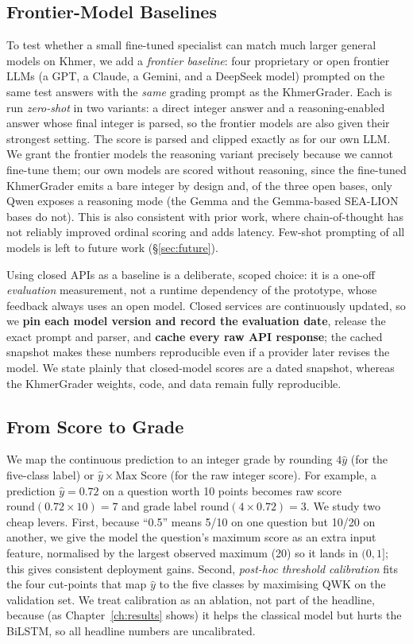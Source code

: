 \subsection{Frontier-Model Baselines}
\label{sec:frontier}
To test whether a small fine-tuned specialist can match much larger general models on Khmer, we add a
\emph{frontier baseline}: four proprietary or open frontier LLMs (a GPT, a Claude, a Gemini, and a
DeepSeek model) prompted on the same test answers with the \emph{same} grading prompt as the
KhmerGrader. Each is run \emph{zero-shot} in two variants: a direct integer answer and a
reasoning-enabled answer whose final integer is parsed, so the frontier models are also given their
strongest setting. The score is parsed and clipped exactly as for our own LLM. We grant the frontier
models the reasoning variant precisely because we cannot fine-tune them; our own models are scored
without reasoning, since the fine-tuned KhmerGrader emits a bare integer by design and, of the three
open bases, only Qwen exposes a reasoning mode (the Gemma and the Gemma-based SEA-LION bases do not).
This is also consistent with prior work, where chain-of-thought has not reliably improved ordinal
scoring and adds latency. Few-shot prompting of all models is left to future work (\S\ref{sec:future}).

Using closed APIs as a baseline is a deliberate, scoped choice: it is a one-off \emph{evaluation}
measurement, not a runtime dependency of the prototype, whose feedback always uses an open model. Closed
services are continuously updated, so we \textbf{pin each model version and record the evaluation date},
release the exact prompt and parser, and \textbf{cache every raw API response}; the cached snapshot makes
these numbers reproducible even if a provider later revises the model. We state plainly that closed-model
scores are a dated snapshot, whereas the KhmerGrader weights, code, and data remain fully reproducible.

\subsection{From Score to Grade}
We map the continuous prediction to an integer grade by rounding $4\hat{y}$ (for the five-class label)
or $\hat{y}\times\text{Max Score}$ (for the raw integer score). For example, a prediction
$\hat{y}=0.72$ on a question worth 10 points becomes raw score $\mathrm{round}(0.72\times10)=7$ and grade
label $\mathrm{round}(4\times0.72)=3$. We study two cheap levers. First, because ``0.5'' means 5/10 on
one question but 10/20 on another, we give the model the question's maximum score as an extra input
feature, normalised by the largest observed maximum (20) so it lands in $(0,1]$; this gives consistent
deployment gains. Second, \emph{post-hoc threshold calibration} fits the four cut-points that map
$\hat{y}$ to the five classes by maximising QWK on the validation set. We treat calibration as an
ablation, not part of the headline, because (as Chapter~\ref{ch:results} shows) it helps the classical
model but hurts the BiLSTM, so all headline numbers are uncalibrated.

